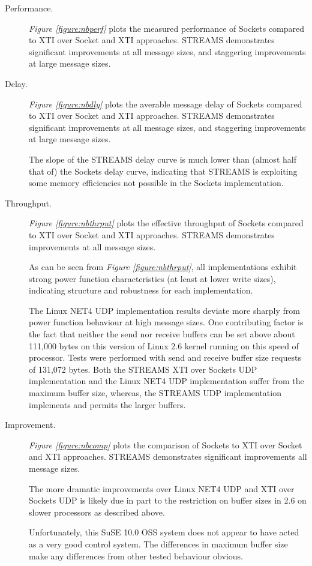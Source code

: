 \documentclass[letterpaper,final,notitlepage,twocolumn,10pt,twoside]{article}
\begin{document}
\begin{description}

\item[Performance.]

\textit{Figure \ref{figure:nbperf}}
plots the measured performance of Sockets compared to XTI over Socket and XTI approaches.  STREAMS
demonstrates significant improvements at all message sizes, and staggering improvements at large
message sizes.

\item[Delay.]

\textit{Figure \ref{figure:nbdly}}
plots the averable message delay of Sockets compared to XTI over Socket and XTI approaches.  STREAMS
demonstrates significant improvements at all message sizes, and staggering improvements at large
message sizes.

The slope of the STREAMS delay curve is much lower than (almost half that of) the Sockets delay
curve, indicating that STREAMS is exploiting some memory efficiencies not possible in the Sockets
implementation.

\item[Throughput.]

\textit{Figure \ref{figure:nbthrput}}
plots the effective throughput of Sockets compared to XTI over Socket and XTI approaches.  STREAMS
demonstrates improvements at all message sizes.

As can be seen from \textit{Figure \ref{figure:nbthrput}}, all implementations exhibit strong power
function characteristics (at least at lower write sizes), indicating structure and robustness for
each implementation.

The Linux NET4 UDP implementation results deviate more sharply from power function behaviour at high
message sizes.  One contributing factor is the fact that neither the send nor receive buffers can be
set above about 111,000 bytes on this version of Linux 2.6 kernel running on this speed of
processor.  Tests were performed with send and receive buffer size requests of 131,072 bytes.  Both
the STREAMS XTI over Sockets UDP implementation and the Linux NET4 UDP implementation suffer from
the maximum buffer size, whereas, the STREAMS UDP implementation implements and permits the larger
buffers.

\item[Improvement.]

\textit{Figure \ref{figure:nbcomp}}
plots the comparison of Sockets to XTI over Socket and XTI approaches.  STREAMS demonstrates
significant improvements all message sizes.

The more dramatic improvements over Linux NET4 UDP and XTI over Sockets UDP is likely due in part to
the restriction on buffer sizes in 2.6 on slower processors as described above.

Unfortunately, this SuSE 10.0 OSS system does not appear to have acted as a very good control
system.  The differences in maximum buffer size make any differences from other tested behaviour
obvious.

\end{description}
\end{document}
